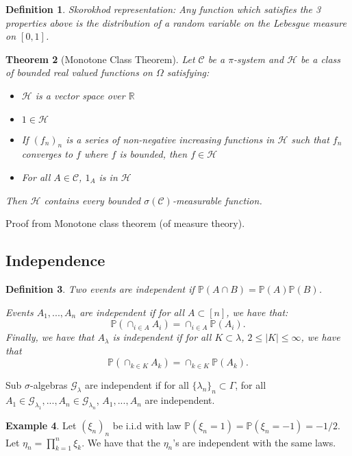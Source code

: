 \documentclass{article}
\newtheorem{theorem}{Theorem}
\newtheorem{definition}[theorem]{Definition}
\theoremstyle{definition}
\newtheorem{example}[theorem]{Example}
\numberwithin{theorem}{section}
\numberwithin{equation}{section}
\begin{document}
\begin{definition}
	Skorokhod representation: Any function which satisfies the 3 properties above is the distribution of a random variable on the Lebesgue measure on $[0, 1]$.
\end{definition}

\begin{theorem}[Monotone Class Theorem]
	Let $\mathcal{C}$ be a $\pi$-system and $\mathcal{H}$ be a class of bounded real valued functions on $\Omega$ satisfying:
	\begin{itemize}
		\item $\mathcal{H}$ is a vector space over $\mathbb{R}$
		\item $1 \in \mathcal{H}$
		\item If $(f_n)_n$ is a series of non-negative increasing functions in $\mathcal{H}$ such that $f_n$ converges to $f$ where $f$ is bounded, then $f \in \mathcal{H}$
		\item For all $A \in \mathcal{C}$, $1_A$ is in $\mathcal{H}$
	\end{itemize}
	Then $\mathcal{H}$ contains every bounded $\sigma(\mathcal{C})$-measurable function. 
\end{theorem}
Proof from Monotone class theorem (of measure theory).

\subsection{Independence}
\begin{definition}
	Two events are independent if $\mathbb{P}(A \cap B) = \mathbb{P}(A) \mathbb{P}(B)$.
	
	Events $A_1, ..., A_n$ are independent if for all $A \subset [n]$, we have that:
	\begin{equation}
		\mathbb{P}(\cap_{i \in A} A_i) = \cap_{i \in A} \mathbb{P}(A_i).
	\end{equation}
	Finally, we have that $A_\lambda$ is independent if for all $K \subset \lambda$, $2 \leq |K| \leq \infty$, we have that
	\begin{equation}
		\mathbb{P}(\cap_{k \in K} A_k) = \cap_{k \in K} \mathbb{P}(A_k).
	\end{equation}
\end{definition}
Sub $\sigma$-algebras $\mathcal{G}_\lambda$ are independent if for all $\{\lambda_n\}_n \subset \Gamma$, for all $A_1 \in \mathcal{G}_{\lambda_1}, ..., A_n \in \mathcal{G}_{\lambda_n}$, $A_1, ..., A_n$ are independent.

\begin{example}
	Let $ (\xi_n)_n $ be i.i.d with law $\mathbb{P}(\xi_n = 1) = \mathbb{P}(\xi_n = -1) = -1/2$. Let $\eta_n = \prod_{k = 1}^{n} \xi_k$. We have that the $\eta_n$'s are independent with the same laws. 
\end{example} 
\end{document}
